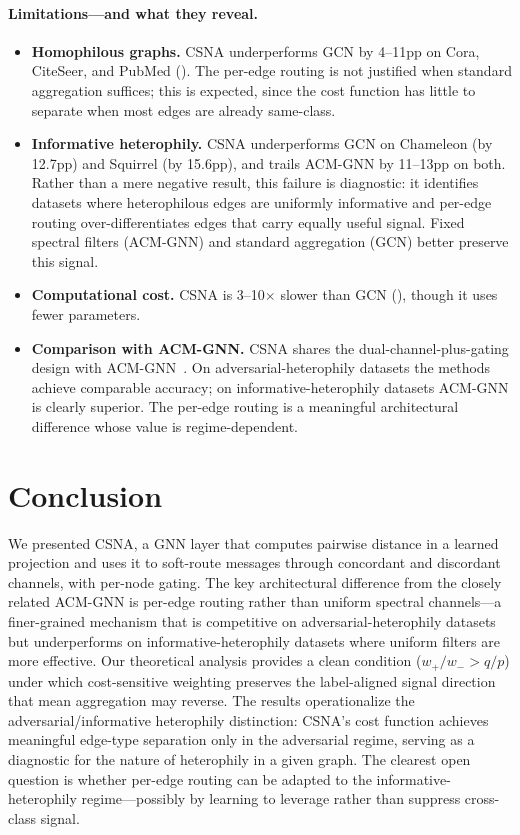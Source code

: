 \documentclass[runningheads]{llncs}
\begin{document}
\paragraph{Limitations---and what they reveal.}
\begin{itemize}
    \item \textbf{Homophilous graphs.} CSNA underperforms GCN by 4--11pp on Cora, CiteSeer, and PubMed (). The per-edge routing is not justified when standard aggregation suffices; this is expected, since the cost function has little to separate when most edges are already same-class.
    \item \textbf{Informative heterophily.} CSNA underperforms GCN on Chameleon (by 12.7pp) and Squirrel (by 15.6pp), and trails ACM-GNN by 11--13pp on both. Rather than a mere negative result, this failure is diagnostic: it identifies datasets where heterophilous edges are uniformly informative and per-edge routing over-differentiates edges that carry equally useful signal. Fixed spectral filters (ACM-GNN) and standard aggregation (GCN) better preserve this signal.
    \item \textbf{Computational cost.} CSNA is 3--10$\times$ slower than GCN (), though it uses fewer parameters.
    \item \textbf{Comparison with ACM-GNN.} CSNA shares the dual-channel-plus-gating design with ACM-GNN~\cite{luan2022revisiting}. On adversarial-heterophily datasets the methods achieve comparable accuracy; on informative-heterophily datasets ACM-GNN is clearly superior. The per-edge routing is a meaningful architectural difference whose value is regime-dependent.
\end{itemize}


\section{Conclusion}\label{sec:conclusion}

We presented CSNA, a GNN layer that computes pairwise distance in a learned projection and uses it to soft-route messages through concordant and discordant channels, with per-node gating.
The key architectural difference from the closely related ACM-GNN is per-edge routing rather than uniform spectral channels---a finer-grained mechanism that is competitive on adversarial-heterophily datasets but underperforms on informative-heterophily datasets where uniform filters are more effective.
Our theoretical analysis provides a clean condition ($w_+/w_- > q/p$) under which cost-sensitive weighting preserves the label-aligned signal direction that mean aggregation may reverse.
The results operationalize the adversarial/informative heterophily distinction: CSNA's cost function achieves meaningful edge-type separation only in the adversarial regime, serving as a diagnostic for the nature of heterophily in a given graph.
The clearest open question is whether per-edge routing can be adapted to the informative-heterophily regime---possibly by learning to leverage rather than suppress cross-class signal.
\end{document}
